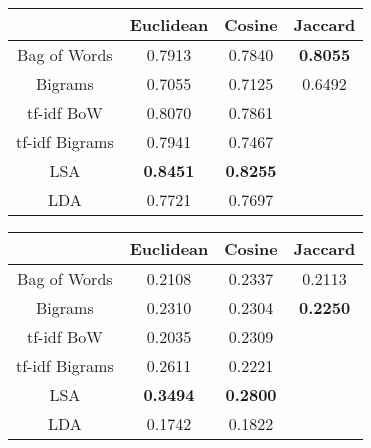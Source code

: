 \documentclass[10pt]{article}
\begin{document}
\begin{center}
\begin{tabular}{|c|c|c|c|}
  \hline
  & Euclidean & Cosine & Jaccard \\ \hline \hline
  Bag of Words & 0.7913 & 0.7840 & \textbf{0.8055} \\ \hline
  Bigrams & 0.7055 & 0.7125 & 0.6492 \\ \hline
  tf-idf BoW & 0.8070 & 0.7861 & \\ \hline
  tf-idf Bigrams & 0.7941 & 0.7467 & \\ \hline
  LSA & \textbf{0.8451} & \textbf{0.8255} & \\ \hline
  LDA & 0.7721 & 0.7697 & \\ \hline
\end{tabular}
\end{center}

\begin{center}
\begin{tabular}{|c|c|c|c|}
  \hline
  & Euclidean & Cosine & Jaccard \\ \hline \hline
  Bag of Words & 0.2108 & 0.2337 & 0.2113 \\ \hline
  Bigrams & 0.2310 & 0.2304 & \textbf{0.2250} \\ \hline
  tf-idf BoW & 0.2035 & 0.2309 & \\ \hline
  tf-idf Bigrams & 0.2611 & 0.2221 & \\ \hline
  LSA & \textbf{0.3494} & \textbf{0.2800} & \\ \hline
  LDA & 0.1742 & 0.1822 & \\ \hline
\end{tabular}
\end{center}
\end{document}
